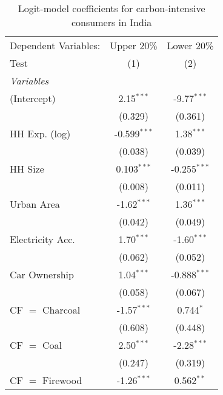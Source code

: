 
\begin{table}[htbp!]
   \centering
   \small
   \begin{adjustbox}{width = 1\textwidth, max height = 0.95\textheight, center}
      \begin{threeparttable}[b]
         \caption{\label{tab:Logit_1_IND} Logit-model coefficients for carbon-intensive consumers in India}
         \begin{tabular}{lcc}
            \tabularnewline \midrule \midrule
            Dependent Variables: & Upper 20\%     & Lower 20\%\\   
            Test                 & (1)            & (2)\\  
            \midrule
            \emph{Variables}\\
            (Intercept)          & 2.15$^{***}$   & -9.77$^{***}$\\   
                                 & (0.329)        & (0.361)\\   
            HH Exp. (log)        & -0.599$^{***}$ & 1.38$^{***}$\\   
                                 & (0.038)        & (0.039)\\   
            HH Size              & 0.103$^{***}$  & -0.255$^{***}$\\   
                                 & (0.008)        & (0.011)\\   
            Urban Area           & -1.62$^{***}$  & 1.36$^{***}$\\   
                                 & (0.042)        & (0.049)\\   
            Electricity Acc.     & 1.70$^{***}$   & -1.60$^{***}$\\   
                                 & (0.062)        & (0.052)\\   
            Car Ownership        & 1.04$^{***}$   & -0.888$^{***}$\\   
                                 & (0.058)        & (0.067)\\   
            CF $=$ Charcoal      & -1.57$^{***}$  & 0.744$^{*}$\\   
                                 & (0.608)        & (0.448)\\   
            CF $=$ Coal          & 2.50$^{***}$   & -2.28$^{***}$\\   
                                 & (0.247)        & (0.319)\\   
            CF $=$ Firewood      & -1.26$^{***}$  & 0.562$^{**}$\\   

\end{tabular}
\end{threeparttable}
\end{adjustbox}
\end{table}
